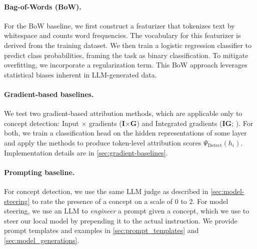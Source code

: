 \documentclass{article}
\theoremstyle{plain}
\theoremstyle{definition}
\theoremstyle{remark}
\newcommand{\TODO}[1]{\textcolor{red}{(TODO: #1)}}
\newcommand{\methodtag}[2]{%
  \tikz[baseline=(char.base)]{%
    \node[
      fill=#1,
      rounded corners=2pt,
      text=white,
      font=\bfseries,
      minimum width=1em,
      minimum height=1em,
      align=center,
      inner sep=0pt
    ](char){#2};%
  }%
}
\newcommand{\concepttag}{\protect\methodtag{conceptcolor}{C}}
\newcommand{\steeringtag}{\protect\methodtag{steeringcolor}{S}}
\begin{document}

\paragraph{\concepttag{} Bag-of-Words (BoW).} For the BoW baseline, we first construct a featurizer that tokenizes text by whitespace and counts word frequencies. The vocabulary for this featurizer is derived from the training dataset. We then train a logistic regression classifier to predict class probabilities, framing the task as binary classification. To mitigate overfitting, we incorporate a regularization term. This BoW approach leverages statistical biases inherent in LLM-generated data.

\paragraph{\concepttag{} Gradient-based baselines.} We test two gradient-based attribution methods, which are applicable only to concept detection: Input $\times$ gradients (\textbf{I$\times$G}) and Integrated gradients (\textbf{IG}; \citealp{integratedgradient}). For both, we train a classification head on the hidden representations of some layer and apply the methods to produce token-level attribution scores $\Psi_{\text{Detect}}(h_i)$. Implementation details are in \cref{sec:gradient-baselines}.

\paragraph{\concepttag{}\steeringtag{} Prompting baseline.} For concept detection, we use the same LLM judge as described in \cref{sec:model-steering} to rate the presence of a concept on a scale of 0 to 2.
For model steering, we use an LLM to \emph{engineer} a prompt 
given a concept, which we use to steer our local model by prepending it to the actual instruction. We provide prompt templates and examples in \cref{sec:prompt_templates} and \cref{sec:model_generations}.
\end{document}
